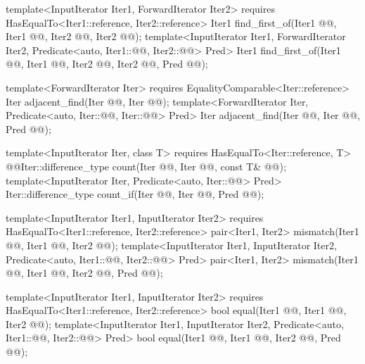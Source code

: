\documentclass[american,twoside]{book}
\begin{document}
\begin{paras}
\begin{codeblock}
{  template<InputIterator Iter1, ForwardIterator Iter2>
    requires HasEqualTo<Iter1::reference, Iter2::reference>
    Iter1 find_first_of(Iter1 @@, Iter1 @@,
                        Iter2 @@, Iter2 @@);
  template<InputIterator Iter1, ForwardIterator Iter2,
           Predicate<auto, Iter1::@@, Iter2::@@> Pred>
    Iter1 find_first_of(Iter1 @@, Iter1 @@,
                        Iter2 @@, Iter2 @@,
                        Pred @@);

  template<ForwardIterator Iter>
    requires EqualityComparable<Iter::reference>
    Iter adjacent_find(Iter @@, Iter @@);
  template<ForwardIterator Iter, Predicate<auto, Iter::@@, Iter::@@> Pred>
    Iter adjacent_find(Iter @@, Iter @@, Pred @@);

  template<InputIterator Iter, class T>
    requires HasEqualTo<Iter::reference, T>
    @\color{addclr}@Iter::difference_type count(Iter @@, Iter @@, const T& @@);
  template<InputIterator Iter, Predicate<auto, Iter::@@> Pred>
    Iter::difference_type count_if(Iter @@, Iter @@, Pred @@);

  template<InputIterator Iter1, InputIterator Iter2>
    requires HasEqualTo<Iter1::reference, Iter2::reference>
    pair<Iter1, Iter2> mismatch(Iter1 @@, Iter1 @@,
                                Iter2 @@);
  template<InputIterator Iter1, InputIterator Iter2,
           Predicate<auto, Iter1::@@, Iter2::@@> Pred>
    pair<Iter1, Iter2> mismatch(Iter1 @@, Iter1 @@,
                                Iter2 @@, Pred @@);

  template<InputIterator Iter1, InputIterator Iter2>
    requires HasEqualTo<Iter1::reference, Iter2::reference>
    bool equal(Iter1 @@, Iter1 @@,
               Iter2 @@);
  template<InputIterator Iter1, InputIterator Iter2,
           Predicate<auto, Iter1::@@, Iter2::@@> Pred>
    bool equal(Iter1 @@, Iter1 @@,
               Iter2 @@, Pred @@);

}
\end{codeblock}
\end{paras}
\end{document}

